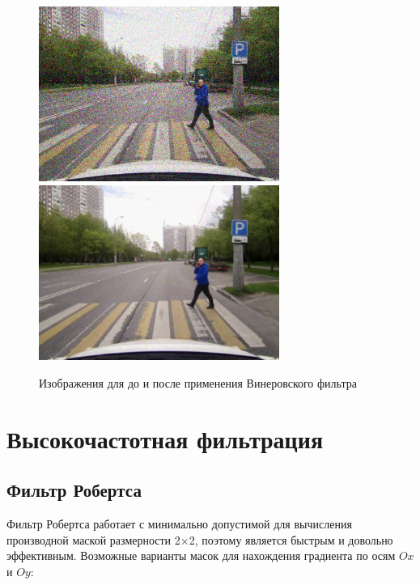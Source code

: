 \begin{figure}[ht]
    \centering
    \includegraphics[width=0.7\textwidth]{../outputs/image_gauss_noise.png}
    \includegraphics[width=0.7\textwidth]{../outputs/image_quant_filter.png}
    \caption{Изображения для до и после применения Винеровского фильтра}
    \label{fig:stitch_images}
\end{figure}

\pagebreak

\section{Высокочастотная фильтрация}

\subsection{Фильтр Робертса}

Фильтр Робертса работает с минимально допустимой для вычисления производной маской размерности 
2×2, поэтому является быстрым и довольно эффективным. Возможные варианты масок
для нахождения градиента по осям $Ox$ и $Oy$:


